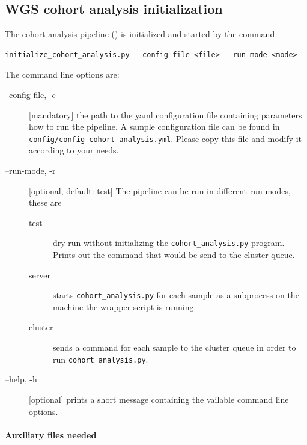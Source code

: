 \documentclass[a4paper]{article}
\begin{document}
\subsection{WGS cohort analysis initialization}
\label{sec:wgs-cohort-analysis-1}


The cohort analysis pipeline () is
initialized and started by the command

\begin{lstlisting}
initialize_cohort_analysis.py --config-file <file> --run-mode <mode>
\end{lstlisting}

The command line options are:

\begin{description}
\item[--config-file, -c] [mandatory] the path to the yaml
  configuration file containing parameters how to run the pipeline. A
  sample configuration file can be found in
  \texttt{config/config-cohort-analysis.yml}. Please copy this file
  and modify it according to your needs.
\item[--run-mode, -r] [optional, default: test] The pipeline can be
  run in different run modes, these are 

  \begin{description}
  \item[test] dry run without initializing the
    \texttt{cohort\_analysis.py} program. Prints out the command
    that would be send to the cluster queue.
  \item[server] starts \texttt{cohort\_analysis.py} for each
    sample as a subprocess on the machine the wrapper script is
    running.
  \item[cluster] sends a command for each sample to the cluster queue
    in order to run \texttt{cohort\_analysis.py}.
  \end{description}
    
\item[--help, -h] [optional] prints a short message containing the
  vailable command line options.
  
\end{description}


\paragraph{Auxiliary files needed}
\end{document}
